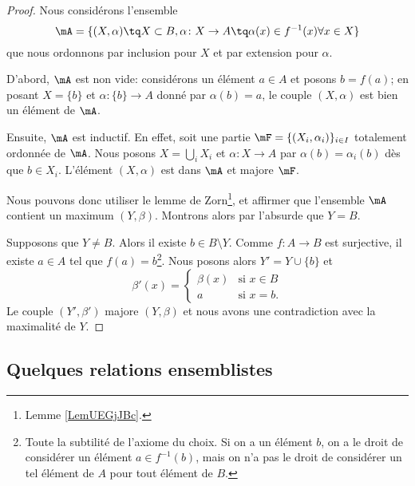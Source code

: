 \begin{proof}
	Nous considérons l'ensemble
	\begin{equation}
		\mA=\{ (X,\alpha)\tq  X\subset B, \alpha \colon X\to A  \tq \alpha(x)\in f^{-1}(x)\forall x\in X \}
	\end{equation}
	que nous ordonnons par inclusion pour \( X\) et par extension pour \( \alpha\).

	D'abord, \( \mA\) est non vide: considérons un élément \( a\in A\) et posons \( b=f(a)\); en posant \( X=\{ b \}\) et \(\alpha \colon \{ b \}\to A  \) donné par \( \alpha(b)=a\), le couple \( (X,\alpha)\) est bien un élément de \( \mA\).

	Ensuite, \( \mA\) est inductif. En effet, soit une partie \( \mF=\{ (X_i,\alpha_i) \}_{i\in I}\) totalement ordonnée de \( \mA\). Nous posons \( X=\bigcup_iX_i \) et \(\alpha \colon X\to A  \) par \( \alpha(b)=\alpha_i(b)\) dès que \( b\in X_i\). L'élément \( (X,\alpha)\) est dans \( \mA\) et majore \( \mF\).

	Nous pouvons donc utiliser le lemme de Zorn\footnote{Lemme \ref{LemUEGjJBc}.}, et affirmer que l'ensemble \( \mA\) contient un maximum \( (Y,\beta)\). Montrons alors par l'absurde que \( Y=B\).

	Supposons que \( Y\neq B\). Alors il existe \( b\in B\setminus Y\). Comme \(f \colon A\to B  \) est surjective, il existe \( a\in A\) tel que \( f(a)=b\)\footnote{Toute la subtilité de l'axiome du choix. Si on a un élément \( b\), on a le droit de considérer un élément \( a\in f^{-1}(b)\), mais on n'a pas le droit de considérer un tel élément de \( A\) pour tout élément de \( B\).}. Nous posons alors \( Y'=Y\cup\{ b \}\) et
	\begin{equation}
		\beta'(x)=\begin{cases}
			\beta(x) & \text{si } x\in B \\
			a        & \text{si }x=b.
		\end{cases}
	\end{equation}
	Le couple \( (Y',\beta')\) majore \( (Y,\beta)\) et nous avons une contradiction avec la maximalité de \( Y\).
\end{proof}



\subsection{Quelques relations ensemblistes}
\label{SUBooRelEnsemblistes}

